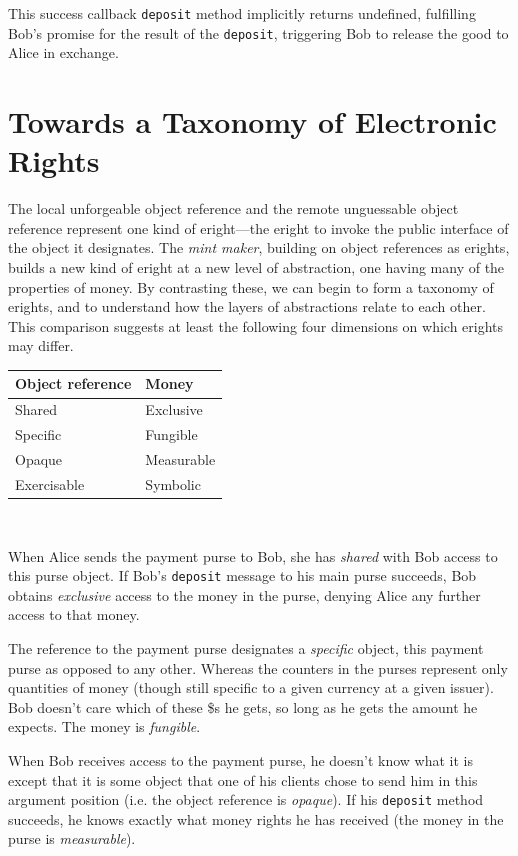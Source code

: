 \documentclass{llncs}
\begin{document}
This success callback {\tt deposit} method implicitly returns undefined, fulfilling Bob's promise for the result of the {\tt deposit}, triggering Bob to release the good to Alice in exchange.


\section{Towards a Taxonomy of Electronic Rights}

The local unforgeable object reference and the remote unguessable object reference represent one kind of eright---the eright to invoke the public interface of the object it designates. The \emph{mint maker}, building on object references as erights, builds a new kind of eright at a new level of abstraction, one having many of the properties of money. By contrasting these, we can begin to form a taxonomy of erights, and to understand how the layers of abstractions relate to each other. This comparison suggests at least the following four dimensions on which erights may differ.

\begin{center}
\begin{tabular}{ l|l }
  Object reference & Money \\ \hline
  Shared & Exclusive \\
  Specific & Fungible \\
  Opaque & Measurable \\
  Exercisable & Symbolic \\
\end{tabular}\\
\end{center}

When Alice sends the payment purse to Bob, she has \emph{shared} with Bob access to this purse object. If Bob's {\tt deposit} message to his main purse succeeds, Bob obtains \emph{exclusive} access to the money in the purse, denying Alice any further access to that money.

The reference to the payment purse designates a \emph{specific} object, this payment purse as opposed to any other. Whereas the counters in the purses represent only quantities of money (though still specific to a given currency at a given issuer). Bob doesn't care which of these \$s he gets, so long as he gets the amount he expects. The money is \emph{fungible}.

When Bob receives access to the payment purse, he doesn't know what it is except that it is some object that one of his clients chose to send him in this argument position (i.e. the object reference is \emph{opaque}). If his {\tt deposit} method succeeds, he knows exactly what money rights he has received (the money in the purse is \emph{measurable}).
\end{document}
